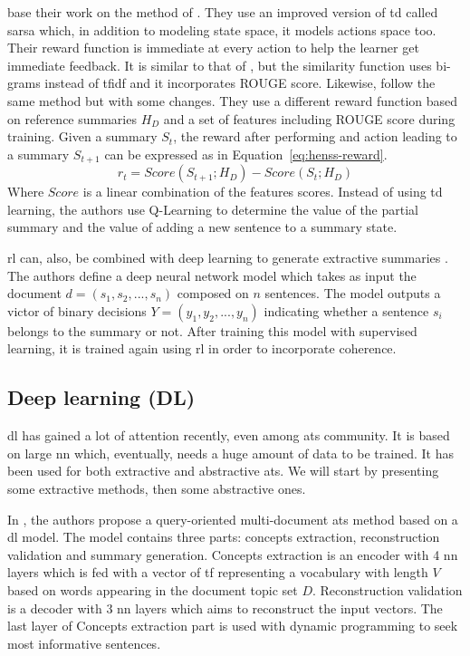 \citet{15-rioux-al} base their work on the method of \citet{12-ryang-abekawa}. 
They use an improved version of \ac{td} called \ac{sarsa} which, in addition to modeling state space, it models actions space too. 
Their reward function is immediate at every action to help the learner get immediate feedback.
It is similar to that of \citet{12-ryang-abekawa}, but the similarity function uses bi-grams instead of \ac{tfidf} and it incorporates ROUGE score.
%
Likewise, \citet{15-henss-al} follow the same method but with some changes. 
They use a different reward function based on reference summaries $ H_D $ and a set of features including ROUGE score during training.
Given a summary $ S_t $, the reward after performing and action leading to a summary $ S_{t+1} $ can be expressed as in Equation~\ref{eq:henss-reward}.
\begin{equation}
\label{eq:henss-reward}
r_{t} = Score(S_{t+1}; H_D) - Score(S_{t}; H_D)
\end{equation}
Where $ Score $ is a linear combination of the features scores.
Instead of using \ac{td} learning, the authors use Q-Learning to determine the value of the partial summary and the value of adding a new sentence to a summary state.

\ac{rl} can, also, be combined with deep learning to generate extractive summaries \citep{18-wu-hu}. 
The authors define a deep neural network model which takes as input the document $ d = (s_1, s_2, ..., s_n) $ composed on $ n $ sentences.
The model outputs a victor of binary decisions $ Y = (y_1, y_2, ..., y_n) $ indicating whether a sentence $ s_i $ belongs to the summary or not.
After training this model with supervised learning, it is trained again using \ac{rl} in order to incorporate coherence.


\subsection{Deep learning (DL)}

\ac{dl} has gained a lot of attention recently, even among \ac{ats} community.
It is based on large \ac{nn} which, eventually, needs a huge amount of data to be trained. 
It has been used for both extractive and abstractive \ac{ats}. 
We will start by presenting some extractive methods, then some abstractive ones.

In \citep{12-liu-al,15-zhong-al}, the authors propose a query-oriented multi-document \ac{ats} method based on a \ac{dl} model.
The model contains three parts: concepts extraction, reconstruction validation and summary generation.
Concepts extraction is an encoder with 4 \ac{nn} layers which is fed with a vector of \ac{tf} representing a vocabulary with length $ V $ based on words appearing in the document topic set $ D $. 
Reconstruction validation is a decoder with 3 \ac{nn} layers which aims to reconstruct the input vectors. 
The last layer of Concepts extraction part is used with dynamic programming to seek most informative sentences. 

